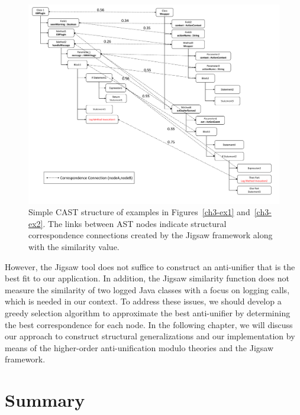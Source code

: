 \begin{figure} [H]
  \centering\includegraphics [width = \textwidth]{Drawing4/FirstCorr.pdf}
  \caption{Simple CAST structure of examples in Figures~\ref{ch3-ex1} and~\ref{ch3-ex2}. The links between AST nodes indicate structural correspondence connections created by the Jigsaw framework along with the similarity value.}
  \label{fig:meth-ast-1}
\end{figure}

However, the Jigsaw tool does not suffice to construct an anti-unifier that is the best fit to our application. In addition, the Jigsaw similarity function does not measure the similarity of two logged Java classes with a focus on logging calls, which is needed in our context. To address these issues, we should develop a greedy selection algorithm to approximate the best anti-unifier by determining the best correspondence for each node. In the following chapter, we will discuss our approach to construct structural generalizations and our implementation by means of the higher-order anti-unification modulo theories and the Jigsaw framework.

\section{Summary}  \label{summary}
